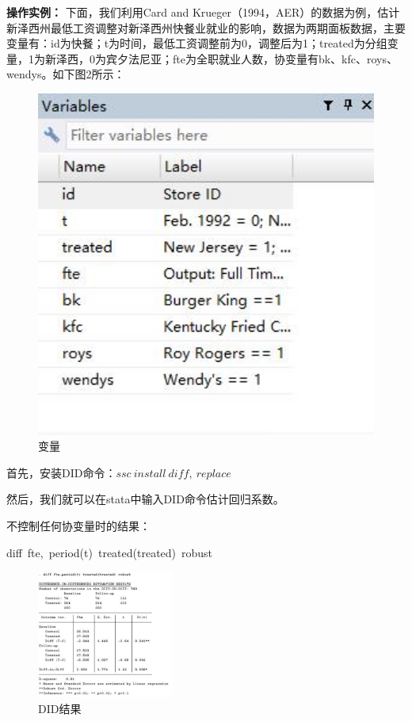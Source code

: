 \documentclass[cn,12pt,math=newtx,citestyle=gb7714-2015,bibstyle=gb7714-2015]{elegantbook}
\begin{document}
	\textbf{操作实例：}
	下面，我们利用Card and Krueger（1994，AER）的数据为例，估计新泽西州最低工资调整对新泽西州快餐业就业的影响，数据为两期面板数据，主要变量有：id为快餐；t为时间，最低工资调整前为0，调整后为1；treated为分组变量，1为新泽西，0为宾夕法尼亚；fte为全职就业人数，协变量有bk、kfc、roys、wendys。如下图2所示：
	\begin{figure}[htbp!]
		\centering
		\includegraphics[width=1\textwidth]{var.jpg}
		\caption{变量}\label{fig:digit}
	\end{figure}
	
	首先，安装DID命令：$ssc~install~diff,~replace$
	
	然后，我们就可以在stata中输入DID命令估计回归系数。
	
	不控制任何协变量时的结果：
	
	diff~fte,~period(t)~treated(treated)~robust
	\begin{figure}[htbp!]
		\centering
		\includegraphics[width=0.4\textwidth]{DIDresults.jpg}
		\caption{DID结果}\label{fig:digit}
	\end{figure}
	
\end{document}
